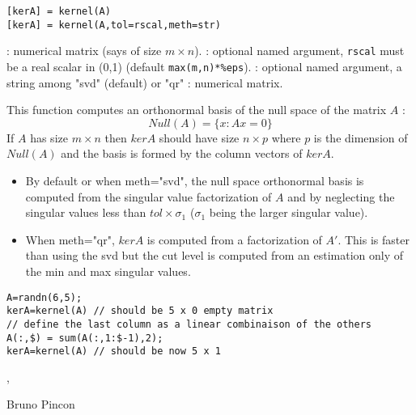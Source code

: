
\begin{mandesc}
\end{mandesc}

\begin{calling_sequence}
\begin{verbatim}
[kerA] = kernel(A) 
[kerA] = kernel(A,tol=rscal,meth=str) 
\end{verbatim}
\end{calling_sequence}
\begin{parameters}
  \begin{varlist}
    :  numerical matrix (says of size $m \times n$).
    : optional named argument, \verb+rscal+ must be  a real scalar in (0,1) (default \verb+max(m,n)*%eps+).
    : optional named argument, a string among "svd" (default) or "qr"
    : numerical matrix.
  \end{varlist}
\end{parameters}

\begin{mandescription}
This function computes an orthonormal basis of the null space of the
matrix $A$ :
$$
    Null(A) = \{ x : Ax = 0 \} 
$$
 If $A$ has size $m \times n$ then $kerA$ should have 
size $n \times p$ where $p$ is the dimension of  $Null(A)$ 
and the basis is formed by the column vectors of $kerA$. 
\begin{itemize}
\item By default or when  meth="svd", the null space orthonormal basis 
is computed from the singular value factorization of $A$ and by 
neglecting the singular values less than $tol \times \sigma_1$
($\sigma_1$ being the larger singular value). 
\item When  meth="qr", $kerA$ is computed from a  
factorization of $A'$. This is faster than using the svd but 
the cut level is computed from an estimation only of the min 
and max singular values.
\end{itemize}
\end{mandescription}

\begin{examples}
\begin{Verbatim}
A=randn(6,5);
kerA=kernel(A) // should be 5 x 0 empty matrix 
// define the last column as a linear combinaison of the others
A(:,$) = sum(A(:,1:$-1),2);
kerA=kernel(A) // should be now 5 x 1
\end{Verbatim}
\end{examples}

\begin{manseealso}
  , 
\end{manseealso}

\begin{authors}
   Bruno Pincon
\end{authors}
